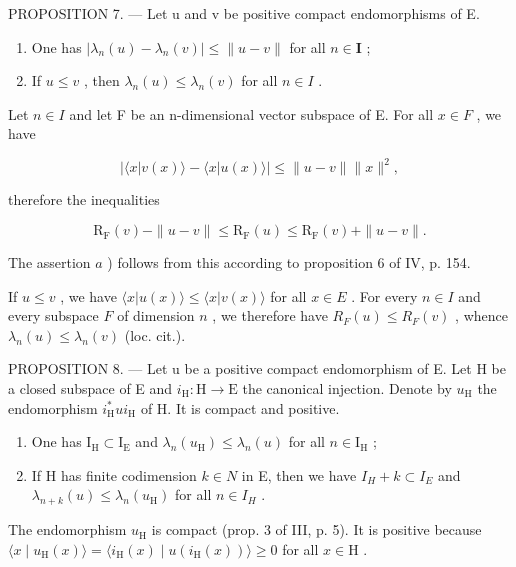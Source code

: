 PROPOSITION 7. --- Let u and v be positive compact endomorphisms of E.

\begin{enumerate}
\def\labelenumi{\alph{enumi})}
\item
  One has \(|\lambda_n(u) - \lambda_n(v)|\leqslant \| u - v\|\) for all \(n\in \mathbf{I}\) ;
\item
  If \(u \leqslant v\) , then \(\lambda_n(u) \leqslant \lambda_n(v)\) for all \(n \in I\) .
\end{enumerate}

Let \(n \in I\) and let F be an n-dimensional vector subspace of E. For all \(x \in F\) , we have

\[
| \langle x | v (x) \rangle - \langle x | u (x) \rangle | \leqslant \| u - v \| \| x \| ^ {2},
\]

therefore the inequalities

\[
\mathrm{R} _ {\mathrm{F}} (v) - \| u - v \| \leqslant \mathrm{R} _ {\mathrm{F}} (u) \leqslant \mathrm{R} _ {\mathrm{F}} (v) + \| u - v \|.
\]

The assertion \(a\) ) follows from this according to proposition 6 of IV, p. 154.

If \(u \leqslant v\) , we have \(\langle x | u(x) \rangle \leqslant \langle x | v(x) \rangle\) for all \(x \in E\) . For every \(n \in I\) and every subspace \(F\) of dimension \(n\) , we therefore have \(R_F(u) \leqslant R_F(v)\) , whence \(\lambda_n(u) \leqslant \lambda_n(v)\) (loc. cit.).

PROPOSITION 8. --- Let u be a positive compact endomorphism of E. Let H be a closed subspace of E and \(i_{\mathrm{H}}: \mathrm{H} \to \mathrm{E}\) the canonical injection. Denote by \(u_{\mathrm{H}}\) the endomorphism \(i_{\mathrm{H}}^{*}ui_{\mathrm{H}}\) of H. It is compact and positive.

\begin{enumerate}
\def\labelenumi{\alph{enumi})}
\item
  One has \(\mathrm{I_H}\subset \mathrm{I_E}\) and \(\lambda_n(u_{\mathrm{H}})\leqslant \lambda_n(u)\) for all \(n\in \mathrm{I_H}\) ;
\item
  If H has finite codimension \(k \in N\) in E, then we have \(I_{H} + k \subset I_{E}\) and \(\lambda_{n+k}(u) \leqslant \lambda_{n}(u_{\mathrm{H}})\) for all \(n \in I_{H}\) .
\end{enumerate}

The endomorphism \(u_{\mathrm{H}}\) is compact (prop. 3 of III, p. 5). It is positive because \(\langle x \mid u_{\mathrm{H}}(x) \rangle = \langle i_{\mathrm{H}}(x) \mid u(i_{\mathrm{H}}(x)) \rangle \geqslant 0\) for all \(x \in \mathrm{H}\) .

